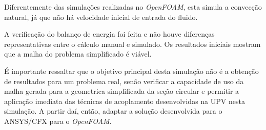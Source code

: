 \documentclass[12pt,openright,twoside,a4paper,english,french,spanish,brazil]{abntex2}
\begin{document}
\begin{anexosenv}
Diferentemente das simulações realizadas no \textit{OpenFOAM}, esta simula a convecção natural, já que não há velocidade inicial de entrada do fluido.

A verificação do balanço de energia foi feita e não houve diferenças representativas entre o cálculo manual e simulado. Os resultados iniciais mostram que a malha do problema simplificado é viável. 

É importante ressaltar que o objetivo principal desta simulação não é a obtenção de resultados para um problema real, senão verificar a capacidade de uso da malha gerada para a geometrica simplificada da seção circular e permitir a aplicação imediata das técnicas de acoplamento desenvolvidas na UPV nesta simulação. A partir daí, então, adaptar a solução desenvolvida para o ANSYS/CFX para o \textit{OpenFOAM}.

\clearpage


%
%
\label{ane:RRFM2013}


%
%
\label{ane:trigafuel}



\end{anexosenv}


\printindex
\end{document}
